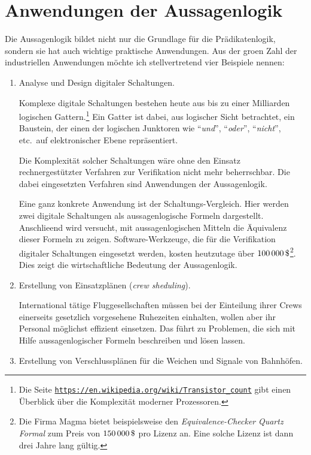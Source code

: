 \section{Anwendungen der Aussagenlogik}
Die Aussagenlogik bildet nicht nur die Grundlage f\"{u}r die Pr\"{a}dikatenlogik, sondern sie hat auch wichtige praktische
Anwendungen.  Aus der gro\3en Zahl der industriellen Anwendungen m\"{o}chte ich stellvertretend vier Beispiele nennen:
\begin{enumerate}
\item Analyse und Design digitaler Schaltungen.

      Komplexe digitale Schaltungen bestehen heute aus bis zu einer Milliarden logischen
      Gattern.\footnote{Die Seite 
      \href{https://en.wikipedia.org/wiki/Transistor_count}{\texttt{https://en.wikipedia.org/wiki/Transistor\_count}}
      gibt einen \"{U}berblick \"{u}ber die Komplexit\"{a}t moderner Prozessoren.}
      Ein Gatter ist dabei, aus logischer Sicht betrachtet, ein Baustein, der einen
      der logischen Junktoren wie ``\textsl{und}'', ``\textsl{oder}'', ``\textsl{nicht}'',
      etc.~auf elektronischer Ebene repr\"{a}sentiert. 
  
      Die Komplexit\"{a}t solcher Schaltungen w\"{a}re ohne den Einsatz
      rechnergest\"{u}tzter Verfahren zur Verifikation nicht mehr beherrschbar.  Die
      dabei eingesetzten Verfahren sind Anwendungen der Aussagenlogik. 

      Eine ganz konkrete Anwendung ist der Schaltungs-Vergleich.  Hier werden zwei
      digitale Schaltungen als aussagenlogische Formeln dargestellt.
      Anschlie\3end wird versucht, mit aussagenlogischen Mitteln die \"{A}quivalenz dieser
      Formeln zu zeigen. Software-Werkzeuge, die f\"{u}r die Verifikation digitaler
      Schaltungen eingesetzt werden, kosten heutzutage \"{u}ber $100\,000\,\symbol{36}$\footnote{
        Die Firma Magma bietet beispielsweise den \emph{Equivalence-Checker}
        \textsl{Quartz Formal} zum Preis von $150\,000\, \symbol{36}$ pro Lizenz an.
      Eine solche Lizenz ist dann drei Jahre lang g\"{u}ltig.}.
      Dies zeigt die wirtschaftliche Bedeutung der Aussagenlogik.

\item Erstellung von Einsatzpl\"{a}nen (\emph{crew sheduling}).

      International t\"{a}tige Fluggesellschaften m\"{u}ssen bei der Einteilung ihrer Crews
      einerseits gesetzlich vorgesehene Ruhezeiten einhalten, wollen aber ihr Personal
      m\"{o}glichst effizient einsetzen.  Das f\"{u}hrt zu Problemen, die sich mit Hilfe
      aussagenlogischer Formeln beschreiben und l\"{o}sen lassen.
\item Erstellung von Verschlusspl\"{a}nen f\"{u}r die Weichen und Signale von Bahnh\"{o}fen.


\end{enumerate}
